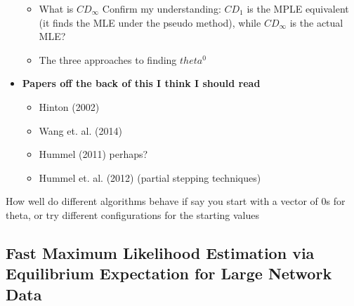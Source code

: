 \begin{itemize}
\begin{itemize}
    \item What is $CD_\infty$ Confirm my understanding: $CD_{1}$ is the MPLE equivalent (it finds the MLE under the pseudo method), while $CD_\infty$ is the actual MLE?
    \item The three approaches to finding $theta^0$
    \end{itemize}
    \item \textbf{Papers off the back of this I think I should read}
    \begin{itemize}
        \item Hinton (2002)
        \item Wang et. al. (2014)
        \item Hummel (2011) perhaps?
        \item Hummel et. al. (2012) (partial stepping techniques)
    \end{itemize}
\end{itemize}

How well do different algorithms behave if say you start with a vector of 0s for theta, or try different configurations for the starting values

\subsection{Fast Maximum Likelihood Estimation via Equilibrium Expectation for Large Network Data}

